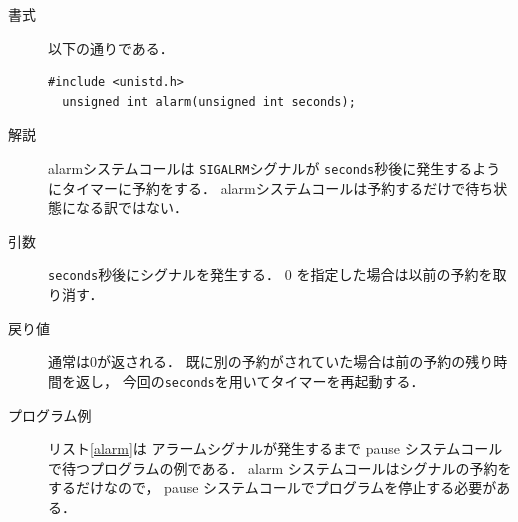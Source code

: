 \begin{description}
\item[書式] 以下の通りである．

\begin{lstlisting}[numbers=none]
  #include <unistd.h>
  unsigned int alarm(unsigned int seconds);
\end{lstlisting}

\item[解説]
  alarmシステムコールは
  \texttt{SIGALRM}シグナルが
  \texttt{seconds}秒後に発生するようにタイマーに予約をする．
  alarmシステムコールは予約するだけで待ち状態になる訳ではない．

\item[引数]
  \texttt{seconds}秒後にシグナルを発生する．
  0 を指定した場合は以前の予約を取り消す．

\item[戻り値]
  通常は0が返される．
  既に別の予約がされていた場合は前の予約の残り時間を返し，
  今回の\texttt{seconds}を用いてタイマーを再起動する．

\item[プログラム例]
  リスト\ref{alarm}は
  アラームシグナルが発生するまで
  pause システムコールで待つプログラムの例である．
  alarm システムコールはシグナルの予約をするだけなので，
  pause システムコールでプログラムを停止する必要がある．

  

\end{description}

%  
%
%
%
